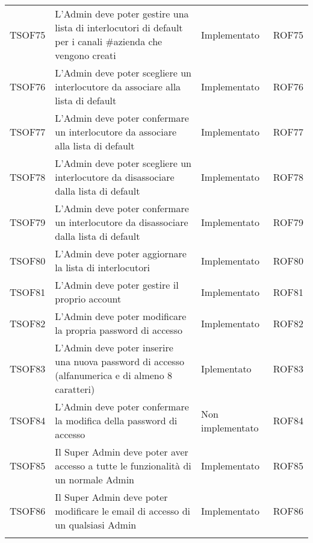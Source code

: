 \documentclass[../PianoDiQualifica_v3.0.0.tex]{subfiles}
\begin{document}
\begin{longtable}[c] { >{\centering\arraybackslash}p{2cm} p{7cm} >{\centering\arraybackslash}p{4cm} >{\centering\arraybackslash}p{2cm}}
			\midrule
			\addlinespace[0.3em]
			TSOF75 & L'Admin deve poter gestire una lista di interlocutori di default per i canali \#azienda che vengono creati & Implementato & ROF75 \\
			\addlinespace[0.3em]
			\midrule
			\addlinespace[0.3em]
			TSOF76 & L'Admin deve poter scegliere un interlocutore da associare alla lista di default	& Implementato & ROF76 \\
			\addlinespace[0.3em]
			\midrule
			\addlinespace[0.3em]
			TSOF77 & L'Admin deve poter confermare un interlocutore da associare alla lista di default	& Implementato & ROF77 \\
			\addlinespace[0.3em]
			\midrule
			\addlinespace[0.3em]
			TSOF78 & L'Admin deve poter scegliere un interlocutore da disassociare dalla lista di default & Implementato & ROF78 \\
			\addlinespace[0.3em]
			\midrule
			\addlinespace[0.3em]
			TSOF79 & L'Admin deve poter confermare un interlocutore da disassociare dalla lista di default & Implementato & ROF79 \\
			\addlinespace[0.3em]
			\midrule
			\addlinespace[0.3em]
			TSOF80 & L'Admin deve poter aggiornare la lista di interlocutori & Implementato & ROF80 \\
			\addlinespace[0.3em]
			\midrule
			\addlinespace[0.3em]
			TSOF81 & L'Admin deve poter gestire il proprio account & Implementato & ROF81 \\
			\addlinespace[0.3em]
			\midrule
			\addlinespace[0.3em]
			TSOF82 & L'Admin deve poter modificare la propria password di accesso & Implementato & ROF82 \\
			\addlinespace[0.3em]
			\midrule
			\addlinespace[0.3em]
			TSOF83 & L'Admin deve poter inserire una nuova password di accesso (alfanumerica e di almeno 8 caratteri) & Iplementato & ROF83 \\
			\addlinespace[0.3em]
			\midrule
			\addlinespace[0.3em]
			TSOF84 & L'Admin deve poter confermare la modifica della password di accesso & Non implementato & ROF84 \\
			\addlinespace[0.3em]
			\midrule
			\addlinespace[0.3em]
			TSOF85 & Il Super Admin deve poter aver accesso a tutte le funzionalità di un normale Admin & Implementato & ROF85 \\
			\addlinespace[0.3em]
			\midrule
			\addlinespace[0.3em]
			TSOF86 & Il Super Admin deve poter modificare le email di accesso di un qualsiasi Admin	& Implementato & ROF86 \\
			\addlinespace[0.3em]
			\midrule

\end{longtable}
\end{document}
